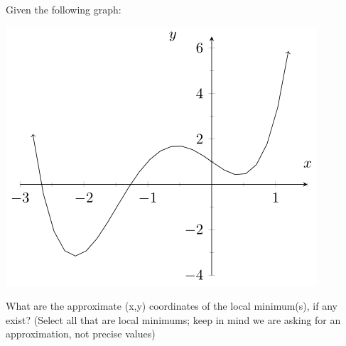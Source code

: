 \documentclass{ximera}
\begin{document}
\begin{problem}
\begin{multipleChoice}
{            }
    \end{multipleChoice}
\end{problem}


\begin{problem}
    Given the following graph:  
    \begin{center}
        \includegraphics{./Picture11.png}
    \end{center}

    What are the approximate (x,y) coordinates of the local minimum(s), if any exist? (Select all that are local minimums; keep in mind we are asking for an approximation, not precise values)
    \begin{multipleChoice}
    \end{multipleChoice}
\end{problem}
    
\end{document}
